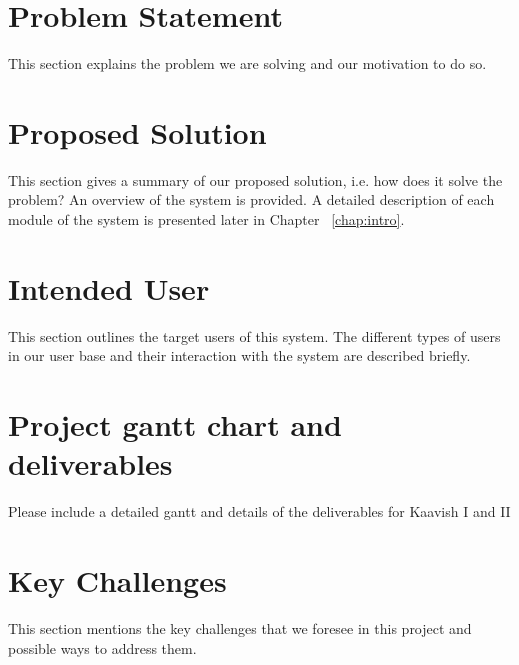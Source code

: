 \section{Problem Statement}

This section explains the problem we are solving and our motivation to do so.

\section{Proposed Solution}

This section gives a summary of our proposed solution, i.e. how does it solve the problem? An overview of the system is provided. A detailed description of each module of the system is presented later in Chapter ~\ref{chap:intro}.

\section{Intended User}

This section outlines the target users of this system. The different types of users in our user base and their interaction with the system are described briefly.

\section{Project gantt chart and deliverables}
Please include a detailed gantt and details of the deliverables for Kaavish I and II

\section{Key Challenges}

This section mentions the key challenges that we foresee in this project and possible ways to address them.